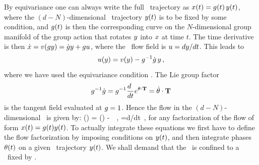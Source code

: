 





\noindent
By equivariance one can always write the full \statesp\
trajectory as $x(t)= g(t)\,y(t)$, where the
$(d\!-\!N)$-dimensional \reducedsp\ trajectory $y(t)$
is to be fixed by some condition, and $g(t)$ is then the
corresponding curve on the $N$-dimensional group manifold of
the group action that rotates $y$ into $x$ at time
$t$. The time derivative is then $\dot{x}=
v(gy) = \dot{g}y + gu$,
where the \reducedsp\ flow field is
$u={dy}/{dt}$. This leads to
\[
u(y) = v(y) - g^{-1} \dot{g} \, y
\,,
\]
where we have used the equivariance condition
. The Lie group factor
\[
g^{-1} \dot{g} =
g^{-1}\frac{d~}{dt} e^{{\bf \theta} \cdot \mathbf{T} } =
\dot{{\bf \theta}} \cdot \mathbf{T}
\]
is the tangent field evaluated at ${g} = 1$.
Hence the flow in the
$(d\!-\!N)$-dimensional \reducedsp\ is given by:
\beq
\velRed(\sspRed) = \vel(\sspRed) - \dot{\gSpace} \cdot \Lg \, \sspRed
\,,\qquad
\velRed={d\sspRed}/{dt}
\,,
for any factorization of the flow of form $x(t)=
g(t)y(t)$. To actually integrate these equations
we first have to define the flow factorization by imposing
conditions on $y(t)$, and then integrate phases
${\bf \theta}(t)$ on a given \reducedsp\ trajectory $y(t)$.
We shall demand that the \reducedsp\ is confined to a \slice\
fixed by .

